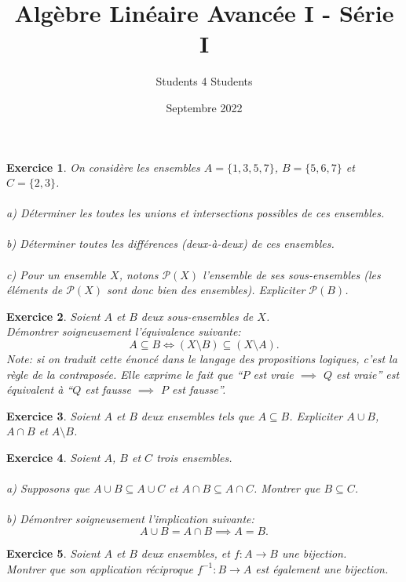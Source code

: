 \documentclass[11pt,french,table]{article}
\title{Algèbre Linéaire Avancée I - Série I}
\author{Students 4 Students}
\date{Septembre 2022}
\theoremstyle{exercice}
\newtheorem{exercice}{Exercice}
\begin{document}
\maketitle
\begin{exercice}
On considère les ensembles $A= \{ 1,3,5,7 \}$, $B = \{5,6,7\}$ et $C = \{2,3\}$. \\ \\
a) Déterminer les toutes les unions et intersections possibles de ces ensembles. \\ \\
b) Déterminer toutes les différences (deux-à-deux) de ces ensembles. \\ \\
c) Pour un ensemble $X$, notons $\mathcal{P}(X)$ l'ensemble de ses sous-ensembles (les éléments de $\mathcal{P}(X)$ sont donc bien des \textit{ensembles}). Expliciter $\mathcal{P}(B)$.
\end{exercice}
\vspace{2em}
\begin{exercice}
Soient $A$ et $B$ deux sous-ensembles de $X$. \\
Démontrer soigneusement l'équivalence suivante: $$A \subseteq B \iff (X \setminus B) \subseteq (X \setminus A).$$
\textit{Note:} si on traduit cette énoncé dans le langage des propositions logiques, c'est la règle de la \textit{contraposée}. Elle exprime le fait que ``$P$ est vraie $\implies$ $Q$ est vraie'' est équivalent à ``$Q$ est fausse $\implies$ $P$ est fausse''.
\end{exercice}
\vspace{2em}
\begin{exercice}
Soient $A$ et $B$ deux ensembles tels que $A \subseteq B$. Expliciter $A \cup B$, $A \cap B$ et $A \setminus B$.
\end{exercice}
\vspace{2em}
\begin{exercice}
Soient $A$, $B$ et $C$ trois ensembles. \\
\\
a) Supposons que $A \cup B \subseteq A \cup C$ et $A \cap B \subseteq A \cap C$. Montrer que $B \subseteq C$. \\ \\
b) Démontrer soigneusement l'implication suivante:
$$A \cup B = A \cap B \implies A = B.$$
\end{exercice}
\vspace{2em}
\begin{exercice}
Soient $A$ et $B$ deux ensembles, et $f: A \longrightarrow B$ une bijection. \\
Montrer que son application réciproque $f^{-1} : B \longrightarrow A$ est également une bijection.
\end{exercice}
\end{document}
